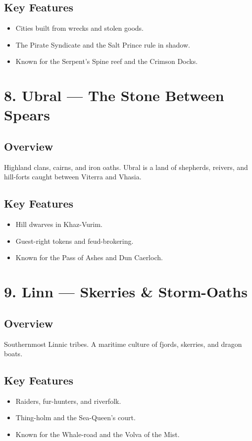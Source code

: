 \documentclass[11pt]{article}
\begin{document}
\subsection*{Key Features}
\begin{itemize}[leftmargin=*]
    \item Cities built from wrecks and stolen goods.
    \item The Pirate Syndicate and the Salt Prince rule in shadow.
    \item Known for the Serpent’s Spine reef and the Crimson Docks.
\end{itemize}

\section*{8. Ubral — The Stone Between Spears}

\subsection*{Overview}
Highland clans, cairns, and iron oaths. Ubral is a land of shepherds, reivers, and hill-forts caught between Viterra and Vhasia.

\subsection*{Key Features}
\begin{itemize}[leftmargin=*]
    \item Hill dwarves in Khaz-Vurim.
    \item Guest-right tokens and feud-brokering.
    \item Known for the Pass of Ashes and Dun Caerloch.
\end{itemize}

\section*{9. Linn — Skerries \& Storm-Oaths}

\subsection*{Overview}
Southernmost Linnic tribes. A maritime culture of fjords, skerries, and dragon boats.

\subsection*{Key Features}
\begin{itemize}[leftmargin=*]
    \item Raiders, fur-hunters, and riverfolk.
    \item Thing-holm and the Sea-Queen’s court.
    \item Known for the Whale-road and the Volva of the Mist.
\end{itemize}
\end{document}
